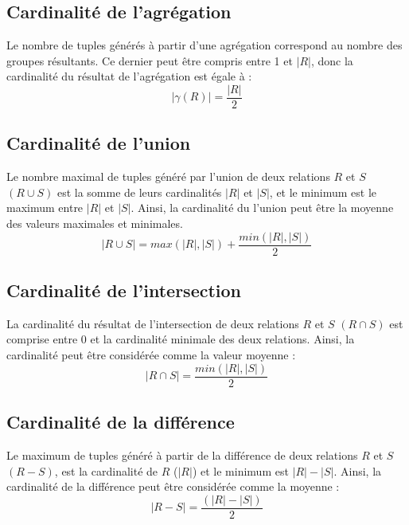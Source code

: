 \subsection{Cardinalité de l'agrégation}
Le nombre de tuples générés à partir d'une agrégation correspond au nombre des groupes résultants. Ce dernier peut être compris entre 1 et $|R|$, donc la cardinalité du résultat de l'agrégation est égale à :
\begin{equation}
 |\gamma(R)| = \frac{|R|}{2}
\end{equation}

\subsection{Cardinalité de l'union}
Le nombre maximal de tuples généré par l'union de deux relations $R$ et $S$ $(R \cup S)$ est la somme de leurs cardinalités $|R|$ et $|S|$, et le minimum est le maximum entre $|R|$ et $|S|$. Ainsi, la cardinalité du l'union peut être la moyenne des valeurs maximales et minimales.
\begin{equation}
 |R \cup S| = max(|R|, |S|) + \frac{min(|R|, |S|)}{2}
\end{equation}

\subsection{Cardinalité de l'intersection}
La cardinalité du résultat de l'intersection de deux relations $R$ et $S$ $(R \cap S)$ est comprise entre 0 et la cardinalité minimale des deux relations. Ainsi, la cardinalité peut être considérée comme la valeur moyenne :
\begin{equation}
 |R \cap S| = \frac{min(|R|, |S|)}{2}
\end{equation}

\subsection{Cardinalité de la différence}
Le maximum de tuples généré à partir de la différence de deux relations $R$ et $S$ $(R - S)$, est la cardinalité de $R$ ($|R|$) et le minimum est $|R| - |S|$. Ainsi, la cardinalité de la différence peut être considérée comme la moyenne :
\begin{equation}
 |R - S| = \frac{(|R| - |S|)}{2}
\end{equation}

